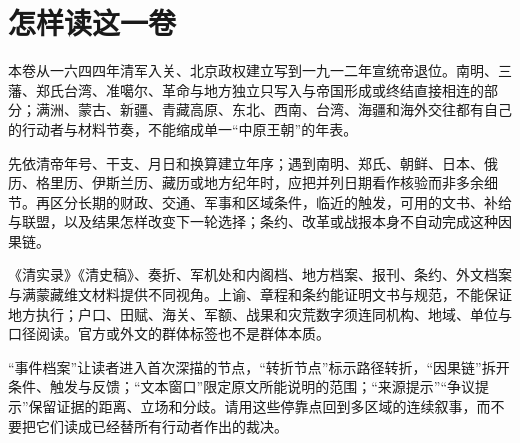 \chapter*{怎样读这一卷}

本卷从一六四四年清军入关、北京政权建立写到一九一二年宣统帝退位。南明、三藩、郑氏台湾、准噶尔、革命与地方独立只写入与帝国形成或终结直接相连的部分；满洲、蒙古、新疆、青藏高原、东北、西南、台湾、海疆和海外交往都有自己的行动者与材料节奏，不能缩成单一“中原王朝”的年表。

先依清帝年号、干支、月日和换算建立年序；遇到南明、郑氏、朝鲜、日本、俄历、格里历、伊斯兰历、藏历或地方纪年时，应把并列日期看作核验而非多余细节。再区分长期的财政、交通、军事和区域条件，临近的触发，可用的文书、补给与联盟，以及结果怎样改变下一轮选择；条约、改革或战报本身不自动完成这种因果链。

《清实录》《清史稿》、奏折、军机处和内阁档、地方档案、报刊、条约、外文档案与满蒙藏维文材料提供不同视角。上谕、章程和条约能证明文书与规范，不能保证地方执行；户口、田赋、海关、军额、战果和灾荒数字须连同机构、地域、单位与口径阅读。官方或外文的群体标签也不是群体本质。

“事件档案”让读者进入首次深描的节点，“转折节点”标示路径转折，“因果链”拆开条件、触发与反馈；“文本窗口”限定原文所能说明的范围；“来源提示”“争议提示”保留证据的距离、立场和分歧。请用这些停靠点回到多区域的连续叙事，而不要把它们读成已经替所有行动者作出的裁决。
